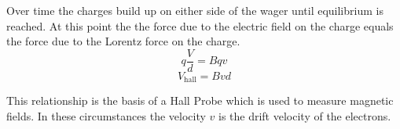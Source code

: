 \documentclass[main.tex]{subfiles}
\begin{document}
Over time the charges build up on either side of the wager until equilibrium is reached. At this point the the force due to the electric field on the charge equals the force due to the Lorentz force on the charge.
$$ q\frac{V}{d} = Bqv $$
$$ V_\text{hall} = Bvd $$

This relationship is the basis of a Hall Probe which is used to measure magnetic fields. In these circumstances the velocity $v$ is the drift velocity of the electrons.
\end{document}
